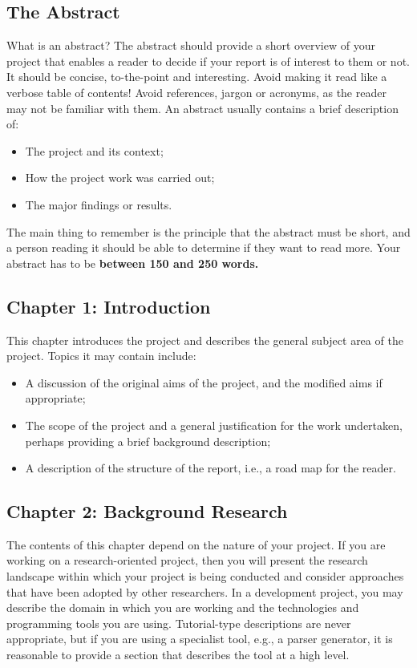 \documentclass[]{final_report}
\begin{document}
\subsection{The Abstract}

What is an abstract? The abstract should provide a short overview of your project that enables a reader to decide if your report is of interest to them or not. It should be concise, to-the-point and interesting. Avoid making it read like a verbose table of contents! Avoid references, jargon or acronyms, as the reader may not be familiar with them. An abstract usually contains a brief description of:

\begin{itemize}
\item The project and its context;
\item How the project work was carried out;
\item The major findings or results.
\end{itemize}

The main thing to remember is the principle that the abstract must be short, and a person reading it should be able to determine if they want to read more. Your abstract has to be \textbf{between 150 and 250 words.}


\subsection{Chapter 1: Introduction}

This chapter introduces the project and describes the general subject area of the project. Topics it may contain include:

\begin{itemize}
\item A discussion of the original aims of the project, and the modified aims if appropriate;
\item The scope of the project and a general justification for the work undertaken, perhaps providing a brief background description;
\item A description of the structure of the report, i.e., a road map for the reader.
\end{itemize}

\subsection{Chapter 2: Background Research}

The contents of this chapter depend on the nature of your project. If you are working on a research-oriented project, then you will present the research landscape within which your project is being conducted and consider approaches that have been adopted by other researchers. In a development project, you may describe the domain in which you are working and the technologies and programming tools you are using. Tutorial-type descriptions are never appropriate, but if you are using a specialist tool, e.g., a parser generator, it is reasonable to provide a section that describes the tool at a high level.
\end{document}
